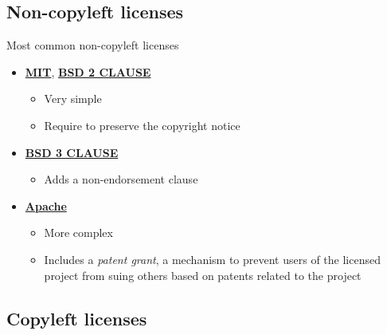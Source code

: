 \subsection{Non-copyleft licenses}

\begin{frame}{Most common non-copyleft licenses}
  \begin{itemize}
    \item {\bf \href{https://en.wikipedia.org/wiki/MIT_License}{MIT}}, {\bf
      \href{https://opensource.org/licenses/BSD-2-Clause}{BSD 2 CLAUSE}}
      \begin{itemize}
        \item Very simple
        \item Require to preserve the copyright notice
      \end{itemize}
    \item {\bf \href{https://opensource.org/licenses/BSD-3-Clause}{BSD 3
        CLAUSE}}
      \begin{itemize}
        \item Adds a non-endorsement clause
      \end{itemize}
    \item {\bf \href{https://www.apache.org/licenses/LICENSE-2.0}{Apache}}
      \begin{itemize}
        \item More complex
        \item Includes a {\em patent grant}, a mechanism to prevent users
          of the licensed project from suing others based on patents
          related to the project
      \end{itemize}
  \end{itemize}
\end{frame}

\subsection{Copyleft licenses}

